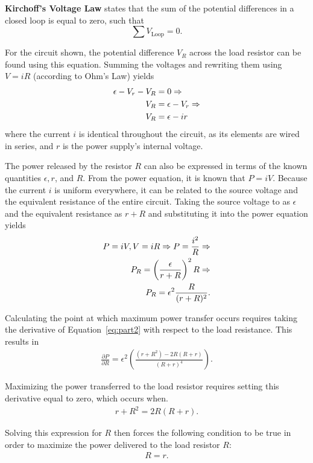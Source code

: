 \documentclass[twocolumn,english]{IEEEtran}
\theoremstyle{plain}
\theoremstyle{plain}
\begin{document}
\textbf{Kirchoff's Voltage Law} states that the sum of the potential differences in a closed loop is equal to zero, such that
\begin{equation*}
 \sum V_{\text{Loop}} = 0.
\end{equation*}

For the circuit shown, the potential difference $V_R$ across the load resistor can be found using this equation. Summing the voltages and rewriting them using $V=iR$ (according to Ohm's Law) yields
\begin{align}\label{eq:part1}
 \epsilon - V_{r} - V_R &= 0 	\Rightarrow \notag \\
 V_R &= \epsilon - V_r 		\Rightarrow \notag \\
 V_R &= \epsilon - ir
\end{align}
where the current $i$ is identical throughout the circuit, as its elements are wired in series, and $r$ is the power supply's internal voltage.

The power released by the resistor $R$ can also be expressed in terms of the known quantities $\epsilon, r$, and $R$. From the power equation, it is known that $P=iV$. Because the current $i$ is uniform everywhere, it can be related to the source voltage and the equivalent resistance of the entire circuit. Taking the source voltage to as $\epsilon$ and the equivalent resistance as $r+R$ and substituting it into the power equation yields
\begin{align}\label{eq:part2}
 P = iV, V = iR \Rightarrow P = \frac{i^2}{R} 	\Rightarrow \notag 	\\
 P_R = \left(\frac{\epsilon}{r+R}\right)^2 R 	\Rightarrow \notag	\\
 P_R = \epsilon^2 \frac{R}{(r+R)^2}.
\end{align}

Calculating the point at which maximum power transfer occurs requires taking the derivative of Equation~\ref{eq:part2} with respect to the load resistance. This results in
\begin{align*}
 \frac{\partial P}{\partial R} = \epsilon^2 \left(\frac{(r+R^2)-2R(R+r)}{(R+r)^4}\right).
\end{align*}

Maximizing the power transferred to the load resistor requires setting this derivative equal to zero, which occurs when.
\begin{align*}
 r+R^2 = 2R(R+r).
\end{align*}

Solving this expression for $R$ then forces the following condition to be true in order to maximize the power delivered to the load resistor $R$:
\begin{align}
 R=r.
\end{align}
\end{document}
